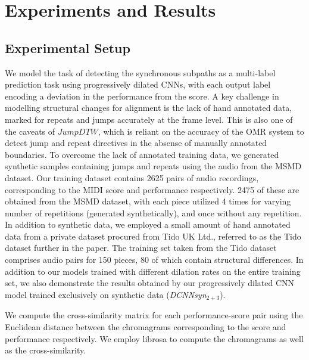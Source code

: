 \documentclass{article}
\begin{document}
\section{Experiments and Results}\label{experiments}
\vspace{-0.2cm}
\subsection{Experimental Setup}\label{setup}
\vspace{-0.1cm}
We model the task of detecting the synchronous subpaths as a multi-label prediction task using progressively dilated CNNs, with each output label encoding a deviation in the performance from the score. 
A key challenge in modelling structural changes for alignment is the lack of hand annotated data, marked for repeats and jumps accurately at the frame level. This is also one of the caveats of \begin{math}\textit{JumpDTW}\end{math}, which is reliant on the accuracy of the OMR system to detect jump and repeat directives in the absense of manually annotated boundaries.
To overcome the lack of annotated training data, we generated synthetic samples containing jumps and repeats using the audio from the MSMD \cite{dorfer2018learning} dataset. 
Our training dataset contains 2625 pairs of audio recordings, corresponding to the MIDI score and performance respectively. 2475 of these are obtained from the MSMD dataset, with each piece utilized 4 times for varying number of repetitions (generated synthetically), and once without any repetition. In addition to synthetic data, we employed a small amount of hand annotated data from a private dataset procured from Tido UK Ltd., referred to as the Tido dataset further in the paper. The training set taken from the Tido dataset comprises audio pairs for 150 pieces, 80 of which contain structural differences. In addition to our models trained with different dilation rates on the entire training set, we also demonstrate the results obtained by our progressively dilated CNN model trained exclusively on synthetic data (\emph{DCNNsyn}${}_{2+3}$).
\par We compute the cross-similarity matrix for each performance-score pair using the Euclidean distance between the chromagrams corresponding to the score and performance respectively. We employ librosa\cite{mcfee2015librosa} to compute the chromagrams as well as the cross-similarity.
\end{document}
